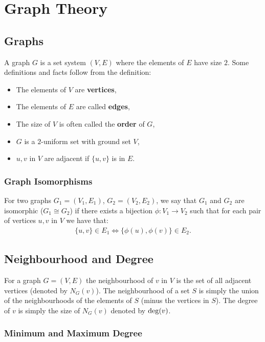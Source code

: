 \section{Graph Theory}

\subsection{Graphs}

A graph $G$ is a set system $(V, E)$ where the elements of $E$ have
size $2$. Some definitions and facts follow from the definition:
\begin{itemize}
  \item The elements of $V$ are \textbf{vertices},
  \item The elements of $E$ are called \textbf{edges},
  \item The size of $V$ is often called the \textbf{order} of $G$,
  \item $G$ is a $2$-uniform set with ground set $V$,
  \item $u, v$ in $V$ are adjacent if $\{u, v\}$ is in $E$.
\end{itemize}  

\subsubsection{Graph Isomorphisms}

For two graphs $G_1 = (V_1, E_1)$, $G_2 = (V_2, E_2)$, we say that
$G_1$ and $G_2$ are isomorphic ($G_1 \cong G_2$) if there exists a
bijection $\phi : V_1 \to V_2$ such that for each pair of vertices
$u, v$ in $V$ we have that: \begin{gather*}
  \{u, v\} \in E_1 \Longleftrightarrow \{\phi(u), \phi(v)\} \in E_2.
\end{gather*}

\subsection{Neighbourhood and Degree}

For a graph $G = (V, E)$ the neighbourhood of $v$ in $V$ 
is the set of all adjacent vertices (denoted by $N_G(v)$). The
neighbourhood of a set $S$ is simply the union of the neighbourhoods
of the elements of $S$ (minus the vertices in $S$).
The degree of $v$ is simply the size of $N_G(v)$ denoted 
by $\operatorname{deg}(v)$.

\subsubsection{Minimum and Maximum Degree}

